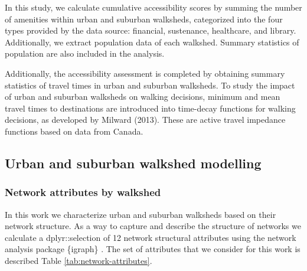 \documentclass[preprint, 3p,
authoryear]{elsarticle} %
\begin{document}
In this study, we calculate cumulative accessibility scores by summing
the number of amenities within urban and suburban walksheds, categorized
into the four types provided by the data source: financial, sustenance,
healthcare, and library. Additionally, we extract population data of
each walkshed. Summary statistics of population are also included in the
analysis.

Additionally, the accessibility assessment is completed by obtaining
summary statistics of travel times in urban and suburban walksheds. To
study the impact of urban and suburban walksheds on walking decisions,
minimum and mean travel times to destinations are introduced into
time-decay functions for walking decisions, as developed by Milward
(2013). These are active travel impedance functions based on data from
Canada.

\subsection{Urban and suburban walkshed
modelling}\label{urban-and-suburban-walkshed-modelling}

\subsubsection{Network attributes by
walkshed}\label{network-attributes-by-walkshed}

In this work we characterize urban and suburban walksheds based on their
network structure. As a way to capture and describe the structure of
networks we calculate a dplyr::selection of 12 network structural
attributes using the network analysis package \{igraph\}
\citep{IgraphManual}. The set of attributes that we consider for this
work is described Table \ref{tab:network-attributes}.
\begingroup\fontsize{7}{9}\selectfont
\end{document}
